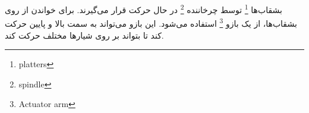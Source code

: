 \begin{flushright}
    بشقاب‌ها
    \footnote{platters}
    توسط چرخاننده
    \footnote{spindle}
    در حال حرکت قرار می‌گیرند.
    برای خواندن از روی بشقاب‌ها، از یک بازو
    \footnote{Actuator arm}
    استفاده می‌شود.
    این بازو می‌تواند به سمت بالا و پایین حرکت کند تا بتواند بر روی شیار‌ها مختلف حرکت کند.

\end{flushright}